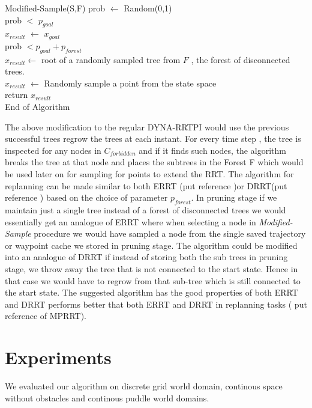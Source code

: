 \documentclass[MTech]{iitmdiss}
\begin{document}
\begin{algorithm}{Modified-Sample(S,F)}{
\label{algo: Modified-Sample}
}
prob $\leftarrow$ Random(0,1)\\
\qif prob $<$ $p_{goal}$\\
\qthen $x_{result}$ $\leftarrow$ $x_{goal}$\\
\qelse \qif prob $< p_{goal} + p_{forest}$\\
\qthen $x_{result} \leftarrow$ root of a randomly sampled tree from $F$ , the forest of disconnected trees.\\
\qelse $x_{result}$ $\leftarrow$ Randomly sample a point from the state space \qfi\qfi\\
return $x_{result}$\\
End of Algorithm
\end{algorithm}

The above modification to the regular DYNA-RRTPI would use the previous successful trees regrow the trees at each instant. For every time step , the tree is inspected for any nodes in $C_{forbidden}$ and if it finds such nodes, the algorithm breaks the tree at that node and places the subtrees in the Forest F which would be used later on for sampling for points to extend the RRT. The algorithm for replanning can be made similar to both ERRT (put reference )or DRRT(put reference ) based on the choice of parameter $p_{forest}$. In pruning stage if we maintain just a single tree instead of a forest of disconnected trees we would essentially get an analogue of ERRT where when selecting a node in \textit{Modified-Sample} procedure we would have sampled a node from the single saved trajectory or waypoint cache we stored in pruning stage. The algorithm could be modified into an analogue of DRRT if instead of storing both the sub trees in pruning stage, we throw away the tree that is not connected to the start state. Hence in that case we would have to regrow from that sub-tree which is still connected to the start state. The suggested algorithm has the good properties of both ERRT and DRRT performs better that both ERRT and DRRT in replanning tasks ( put reference of MPRRT).

\section{Experiments}

We evaluated our algorithm on discrete grid world domain, continous space without obstacles and continous puddle world domains. 
\end{document}
